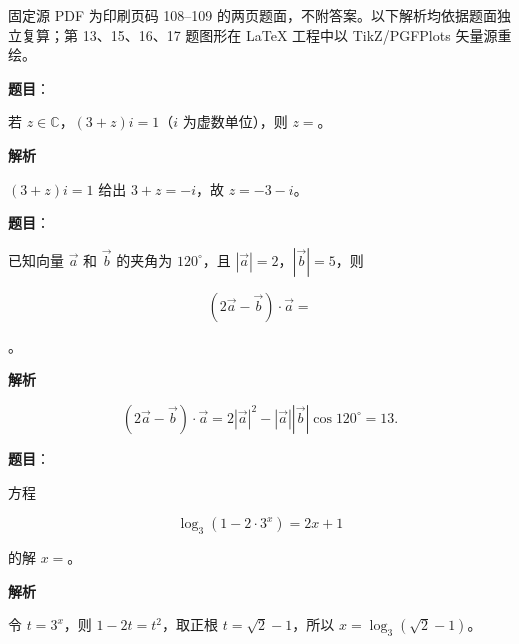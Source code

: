 

\begin{gktip}
固定源 PDF 为印刷页码 108–109 的两页题面，不附答案。以下解析均依据题面独立复算；第 13、15、16、17 题图形在 LaTeX 工程中以 TikZ/PGFPlots 矢量源重绘。
\end{gktip}


\begin{answer}

\textbf{题目}：

若 $z\in\mathbb C$，$(3+z)i=1$（$i$ 为虚数单位），则 $z=$\gkblank{}。

\textbf{解析}

$(3+z)i=1$ 给出 $3+z=-i$，故 $z=-3-i$。


\end{answer}
\begin{answer}

\textbf{题目}：

已知向量 $\vec a$ 和 $\vec b$ 的夹角为 $120^\circ$，且 $|\vec a|=2$，$|\vec b|=5$，则

\nopagebreak[4]
\[
(2\vec a-\vec b)\cdot\vec a=
\]

\gkblank{}。

\textbf{解析}

\nopagebreak[4]
\[
(2\vec a-\vec b)\cdot\vec a
=2|\vec a|^2-|\vec a||\vec b|\cos120^\circ
=13.
\]


\end{answer}
\begin{answer}

\textbf{题目}：

方程

\nopagebreak[4]
\[
\log_3(1-2\cdot3^x)=2x+1
\]

的解 $x=$\gkblank{}。

\textbf{解析}

令 $t=3^x$，则 $1-2t=t^2$，取正根 $t=\sqrt2-1$，所以 $x=\log_3(\sqrt2-1)$。


\end{answer}
